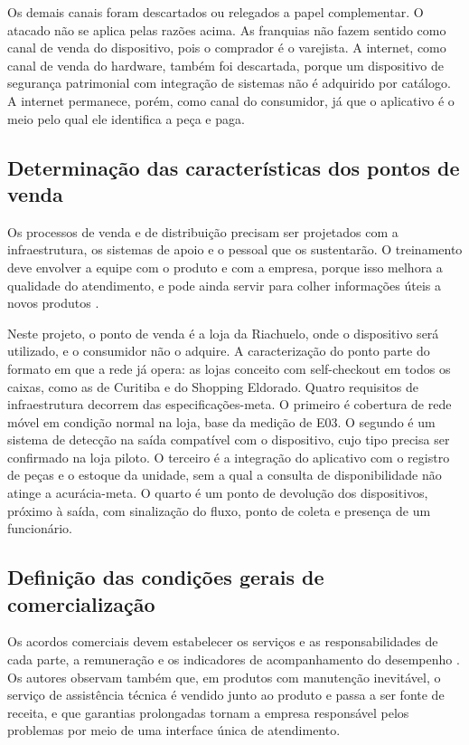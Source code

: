 Os demais canais foram descartados ou relegados a papel complementar. O atacado não se aplica pelas razões acima. As franquias não fazem sentido como canal de venda do dispositivo, pois o comprador é o varejista. A internet, como canal de venda do hardware, também foi descartada, porque um dispositivo de segurança patrimonial com integração de sistemas não é adquirido por catálogo. A internet permanece, porém, como canal do consumidor, já que o aplicativo é o meio pelo qual ele identifica a peça e paga.

\subsection{Determinação das características dos pontos de venda}
\label{subsec:comerc_pontos}

Os processos de venda e de distribuição precisam ser projetados com a infraestrutura, os sistemas de apoio e o pessoal que os sustentarão. O treinamento deve envolver a equipe com o produto e com a empresa, porque isso melhora a qualidade do atendimento, e pode ainda servir para colher informações úteis a novos produtos \cite{rozenfeld2006gestao}.

Neste projeto, o ponto de venda é a loja da Riachuelo, onde o dispositivo será utilizado, e o consumidor não o adquire. A caracterização do ponto parte do formato em que a rede já opera: as lojas conceito com self-checkout em todos os caixas, como as de Curitiba e do Shopping Eldorado. Quatro requisitos de infraestrutura decorrem das especificações-meta. O primeiro é cobertura de rede móvel em condição normal na loja, base da medição de E03. O segundo é um sistema de detecção na saída compatível com o dispositivo, cujo tipo precisa ser confirmado na loja piloto. O terceiro é a integração do aplicativo com o registro de peças e o estoque da unidade, sem a qual a consulta de disponibilidade não atinge a acurácia-meta. O quarto é um ponto de devolução dos dispositivos, próximo à saída, com sinalização do fluxo, ponto de coleta e presença de um funcionário.




\subsection{Definição das condições gerais de comercialização}
\label{subsec:comerc_condicoes}

Os acordos comerciais devem estabelecer os serviços e as responsabilidades de cada parte, a remuneração e os indicadores de acompanhamento do desempenho \cite{rozenfeld2006gestao}. Os autores observam também que, em produtos com manutenção inevitável, o serviço de assistência técnica é vendido junto ao produto e passa a ser fonte de receita, e que garantias prolongadas tornam a empresa responsável pelos problemas por meio de uma interface única de atendimento.

